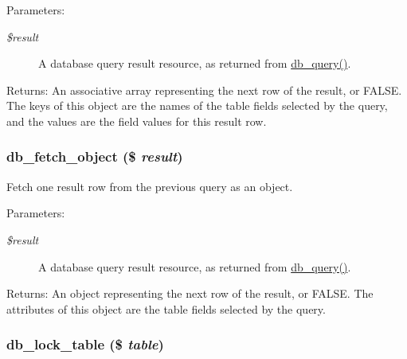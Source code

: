 \begin{Desc}
\item[Parameters:]
\begin{description}
\item[{\em \$result}]A database query result resource, as returned from \hyperlink{database_8mysql-common_8inc_9e096321b86945d128746ac7bedce8f3}{db\_\-query()}. \end{description}
\end{Desc}
\begin{Desc}
\item[Returns:]An associative array representing the next row of the result, or FALSE. The keys of this object are the names of the table fields selected by the query, and the values are the field values for this result row. \end{Desc}
\hypertarget{database_8mysql_8inc_5faaeba7105d28828db453b4fd3c75d4}{
\subsubsection[{db\_\-fetch\_\-object}]{\setlength{\rightskip}{0pt plus 5cm}db\_\-fetch\_\-object (\$ {\em result})}}
\label{database_8mysql_8inc_5faaeba7105d28828db453b4fd3c75d4}


Fetch one result row from the previous query as an object.

\begin{Desc}
\item[Parameters:]
\begin{description}
\item[{\em \$result}]A database query result resource, as returned from \hyperlink{database_8mysql-common_8inc_9e096321b86945d128746ac7bedce8f3}{db\_\-query()}. \end{description}
\end{Desc}
\begin{Desc}
\item[Returns:]An object representing the next row of the result, or FALSE. The attributes of this object are the table fields selected by the query. \end{Desc}
\hypertarget{database_8mysql_8inc_8584042b05393a82b7d06c2ee6cf95ed}{
\subsubsection[{db\_\-lock\_\-table}]{\setlength{\rightskip}{0pt plus 5cm}db\_\-lock\_\-table (\$ {\em table})}}
\label{database_8mysql_8inc_8584042b05393a82b7d06c2ee6cf95ed}


